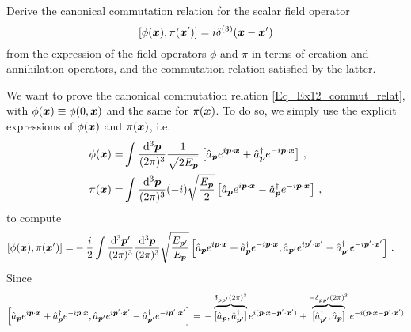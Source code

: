 \begin{ex} \label{ex_12} 
    Derive the canonical commutation relation for the scalar field operator
    \begin{equation}
        \left[ \phi(\boldsymbol{x}), \pi(\boldsymbol{x} ')\right] = i \delta^{(3)}(\boldsymbol{x} - \boldsymbol{x}')
        \label{Eq_Ex12_commut_relat}
    \end{equation}
    from the expression of the field operators $\phi$ and $\pi$ in terms of creation and annihilation operators, and the commutation relation satisfied by the latter.
\end{ex}

\begin{sol}
    We want to prove the canonical commutation relation \eqref{Eq_Ex12_commut_relat}, with $\phi(\boldsymbol{x})\equiv \phi(0, \boldsymbol{x})$ and the same for $\pi(\boldsymbol{x})$. To do so, we simply use the explicit expressions of $\phi(\boldsymbol{x})$ and $\pi(\boldsymbol{x})$, i.e.
    \begin{equation}
    \begin{split}
        \phi(\boldsymbol{x}) = & \int \frac{{\rm d}^3\boldsymbol{p}}{(2\pi)^3} \frac{1}{\sqrt{2E_{\boldsymbol{p}}}} \left[\hat{a}_{\boldsymbol{p}} e^{i \boldsymbol{p} \cdot \boldsymbol{x}} + \hat{a}^\dagger_{\boldsymbol{p}} e^{-i \boldsymbol{p} \cdot \boldsymbol{x}}\right] \, , \\
        \pi(\boldsymbol{x}) = & \int \frac{{\rm d}^3\boldsymbol{p}}{(2\pi)^3} (-i) \sqrt{\frac{E_{\boldsymbol{p}}}{2}} \left[\hat{a}_{\boldsymbol{p}} e^{i \boldsymbol{p} \cdot \boldsymbol{x}} - \hat{a}^\dagger_{\boldsymbol{p}} e^{-i \boldsymbol{p} \cdot \boldsymbol{x}}\right] \, ,
    \end{split}
    \end{equation}
    to compute 
    \begin{equation}
    \begin{split}
        [\phi(\boldsymbol{x}), \pi(\boldsymbol{x}')] = & - \frac{i}{2} \int \frac{{\rm d}^3\boldsymbol{p}'}{(2\pi)^3} \frac{{\rm d}^3\boldsymbol{p}}{(2\pi)^3} \sqrt{\frac{E_{\boldsymbol{p}'}}{E_{\boldsymbol{p}}}} \left[\hat{a}_{\boldsymbol{p}} e^{i \boldsymbol{p} \cdot \boldsymbol{x}} + \hat{a}^\dagger_{\boldsymbol{p}} e^{-i \boldsymbol{p} \cdot \boldsymbol{x}} , \hat{a}_{\boldsymbol{p}'} e^{i \boldsymbol{p}' \cdot \boldsymbol{x}'} - \hat{a}^\dagger_{\boldsymbol{p}'} e^{-i \boldsymbol{p}' \cdot \boldsymbol{x}'}\right] \, .
    \end{split}
    \end{equation}
    Since
    \begin{equation}
    \begin{split}
        \left[\ades_{\vp} e^{i \vp \cdot \vx} + \acon_{\vp} e^{-i \vp \cdot \vx} , \ades_{\vp'} e^{i \vp' \cdot \vx'} - \acon_{\vp'} e^{-i \vp' \cdot \vx'}\right] = & \, - \overbrace{[\ades_{\vp}, \acon_{\vp'}]}^{\delta_{\vp \vp'} (2\pi)^3} e^{i(\vp\cdot \vx - \vp'\cdot \vx')} + \overbrace{[\acon_{\vp'}, \ades_{\vp}]}^{-\delta_{\vp \vp'} (2\pi)^3} e^{-i(\vp\cdot \vx - \vp'\cdot \vx')} \\

\end{split}
\end{equation}
\end{sol}
